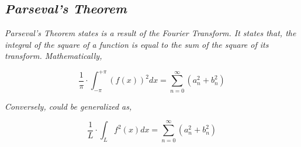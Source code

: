 

\subsection{\textit{Parseval's Theorem}}

	\textit{Parseval's Theorem states is a result of the Fourier Transform. It states that, the integral of the square of a function is equal to the sum of the square of its transform. Mathematically,}
	
		$$\frac{1}{\pi}\cdot\int_{-\pi}^{+\pi} \left(f(x)\right)^2 dx = \sum_{n=0}^{\infty}\left(a_{n}^2 + b_{n}^2\right)$$

	\textit{Conversely, could be generalized as,}

		$$\frac{1}{L}\cdot\int_{L} f^2(x) dx = \sum_{n=0}^{\infty}\left(a_{n}^2 + b_{n}^2\right)$$



